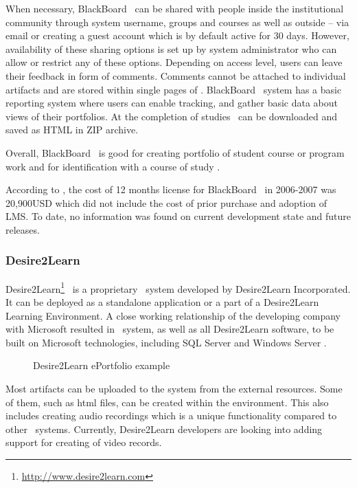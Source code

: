 When necessary, BlackBoard \ep~can be shared with people inside the
institutional community through system username, groups and courses as well as
outside -- via email or creating a guest account which is by default active for
30 days. However, availability of these sharing options is set up by system
administrator who can allow or restrict any of these options. Depending on
access level, users can leave their feedback in form of comments. Comments
cannot be attached to individual artifacts and are stored within single pages of
\ep. BlackBoard \ep~system has a basic reporting system where users can enable
tracking, and gather basic data about views of their portfolios. At the
completion of studies \ep~can be downloaded and saved as HTML in ZIP archive.

Overall, BlackBoard \ep~is good for creating portfolio of student course or
program work and for identification with a course of study
\citep{UniversityofTorontoScarborough2010}. 

According to \citet{Sweat-Guy2007}, the cost of 12 months license for
BlackBoard \ep~in 2006-2007 was 20,900USD which did not include the cost of
prior purchase and adoption of LMS. To date, no information was found on current
development state and future releases.

\subsubsection{Desire2Learn}
Desire2Learn\footnote{\url{http://www.desire2learn.com}} \ep~is a proprietary
\ep~system developed by Desire2Learn Incorporated. It can be deployed as a
standalone application or a part of a Desire2Learn Learning Environment. A close
working relationship of the developing company with Microsoft resulted in
\ep~system, as well as all Desire2Learn software, to be built on Microsoft
technologies, including SQL Server and Windows Server \citep{AAEEBL2011a}.

\begin{figure}[htb]
\centering
\setlength\fboxsep{0pt}
\setlength\fboxrule{0.5pt}
\fbox{\texttt{[image: CH4-F7-D2L]}}
\caption[Desire2Learn ePortfolio example]{Desire2Learn ePortfolio example
\citep{Desire2LearnIncorporated2011}}
\label{fig:d2ep} 
\end{figure}

Most artifacts can be uploaded to the system from the external resources. Some
of them, such as html files, can be created within the environment. This also
includes creating audio recordings which is a unique functionality compared to
other \ep~systems. Currently, Desire2Learn developers are looking into adding
support for creating of video records.

